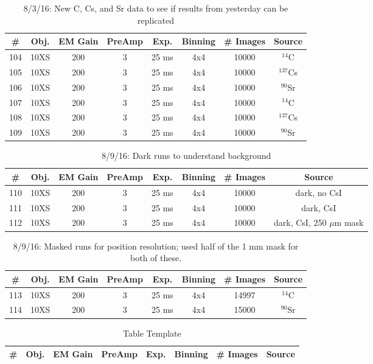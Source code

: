 \documentclass[12pt]{amsart}
\begin{document}
\begin{table}[!htbp]
	\centering
	\caption{8/3/16: New C, Cs, and Sr data to see if results from yesterday can be replicated}
	\label{tab:table19}
	\hspace*{-1cm}
	\begin{tabular}{cccccccc}
	\toprule
	\# & Obj. & EM Gain & PreAmp & Exp. & Binning & \# Images & Source\\
	\midrule
	104 & 10XS & 200 & 3 & 25 ms & 4x4 & 10000 & $^{14}$C\\
	105 & 10XS & 200 & 3 & 25 ms & 4x4 & 10000 & $^{137}$Cs\\
	106 & 10XS & 200 & 3 & 25 ms & 4x4 & 10000 & $^{90}$Sr\\
	107 & 10XS & 200 & 3 & 25 ms & 4x4 & 10000 & $^{14}$C\\
	108 & 10XS & 200 & 3 & 25 ms & 4x4 & 10000 & $^{137}$Cs\\
	109 & 10XS & 200 & 3 & 25 ms & 4x4 & 10000 & $^{90}$Sr\\
	\bottomrule
	\end{tabular}
	\hspace*{-1cm}
\end{table}

\begin{table}[!htbp]
	\centering
	\caption{8/9/16: Dark runs to understand background}
	\label{tab:table20}
	\hspace*{-1cm}
	\begin{tabular}{cccccccc}
	\toprule
	\# & Obj. & EM Gain & PreAmp & Exp. & Binning & \# Images & Source\\
	\midrule
	110 & 10XS & 200 & 3 & 25 ms & 4x4 & 10000 & dark, no CsI\\
	111 & 10XS & 200 & 3 & 25 ms & 4x4 & 10000 & dark, CsI\\
	112 & 10XS & 200 & 3 & 25 ms & 4x4 & 10000 & dark, CsI, 250 $\mu$m mask\\
	\bottomrule
	\end{tabular}
	\hspace*{-1cm}
\end{table}

\begin{table}[!htbp]
	\centering
	\caption{8/9/16: Masked runs for position resolution; used half of the 1 mm mask for both of these.}
	\label{tab:table21}
	\hspace*{-1cm}
	\begin{tabular}{cccccccc}
	\toprule
	\# & Obj. & EM Gain & PreAmp & Exp. & Binning & \# Images & Source\\
	\midrule
	113 & 10XS & 200 & 3 & 25 ms & 4x4 & 14997 & $^{14}$C\\
	114 & 10XS & 200 & 3 & 25 ms & 4x4 & 15000 & $^{90}$Sr\\
	\bottomrule
	\end{tabular}
	\hspace*{-1cm}
\end{table}

\begin{table}[!htbp]
	\centering
	\caption{Table Template}
	\label{tab:table0000}
	\hspace*{-1cm}
	\begin{tabular}{cccccccc}
	\toprule
	\# & Obj. & EM Gain & PreAmp & Exp. & Binning & \# Images & Source\\
	\midrule
	\bottomrule
	\end{tabular}
	\hspace*{-1cm}
\end{table}
\end{document}
